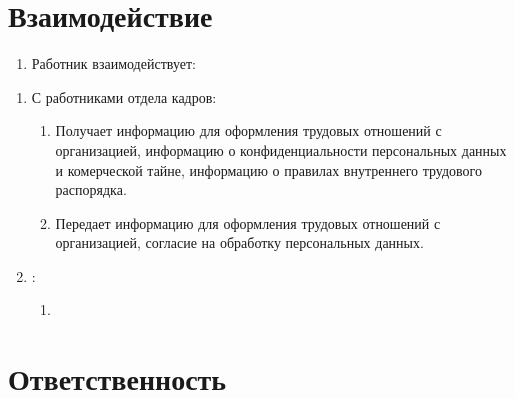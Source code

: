 \documentclass[a4paper, 12pt, twoside]{article}
\begin{document}
\section{Взаимодействие}
\begin{enumerate}[label=, labelsep=0ex]
  \item Работник взаимодействует:
\end{enumerate}
\begin{enumerate}[label=4.\arabic*.]
  \item С работниками отдела кадров:
  \begin{enumerate}[label=4.1.\arabic*.]
    \item Получает информацию для оформления трудовых отношений с организацией, информацию о конфиденциальности персональных данных и комерческой тайне, информацию о правилах внутреннего трудового распорядка.
    \item Передает информацию для оформления трудовых отношений с организацией, согласие на обработку персональных данных.
  \end{enumerate}
  \item :
  \begin{enumerate}[label=4.2.\arabic*.]
    \item 
  \end{enumerate}
\end{enumerate}

\section{Ответственность}
\end{document}
